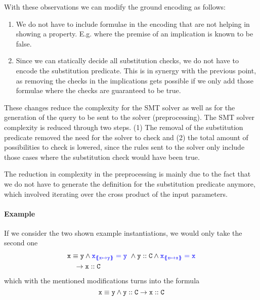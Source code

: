 \documentclass[a4paper]{article}
\begin{document}
With these observations we can modify the ground encoding as follows:
\begin{enumerate}
  \item We do not have to include formulae in the encoding that are not helping in showing a property.
        E.g. where the premise of an implication is known to be false.
  \item Since we can statically decide all substitution checks,
        we do not have to encode the substitution predicate.
        This is in synergy with the previous point,
        as removing the checks in the implications gets possible
        if we only add those formulae where the checks
        are guaranteed to be true.
\end{enumerate}

These changes reduce the complexity for the SMT solver as well as for the
generation of the query to be sent to the solver (preprocessing).
The SMT solver complexity is reduced through two steps.
(1) The removal of the substitution predicate removed the need for
the solver to check and
(2) the total amount of possibilities to check is lowered,
since the rules sent to the solver only include those cases where the
substitution check would have been true.

The reduction in complexity in the preprocessing is mainly due to the fact
that we do not have to generate the definition for the substitution predicate anymore,
which involved iterating over the cross product of the input parameters.

\paragraph{Example}
If we consider the two shown example instantiations, we would only take the second one
\begin{align*}
  &\mathit{\mathtt{x}} \equiv \mathit{\mathtt{y}} \land
   {\color{blue}\ensuremath{\mathtt{x}_{\{\mskip-6.9mu\{ \mathtt{x} \mapsto \mathtt{y} \}\mskip-6.9mu\}}}=\mathtt{y}}~\land
   \mathit{\mathtt{y}} :: \mathit{\mathtt{C}} \land
   {\color{blue}\ensuremath{\mathtt{x}_{\{\mskip-6.9mu\{ \mathtt{x} \mapsto \mathtt{x} \}\mskip-6.9mu\}}}=\mathtt{x}}\\
  &\quad \rightarrow \mathit{\mathtt{x}} :: \mathit{\mathtt{C}}
\end{align*}
which with the mentioned modifications turns into the formula
\[
  \mathit{\mathtt{x}} \equiv \mathit{\mathtt{y}} \land \mathit{\mathtt{y}} :: \mathit{\mathtt{C}} \rightarrow \mathit{\mathtt{x}} :: \mathit{\mathtt{C}}
\]
\end{document}
